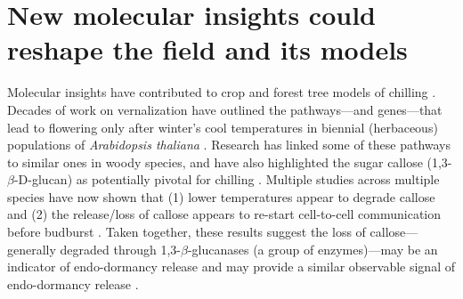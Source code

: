 \documentclass[11pt]{article}
\begin{document}
\section*{New molecular insights could reshape the field and its models} 

Molecular insights have contributed to crop and forest tree models of chilling \citep{chuinearees}. Decades of work on vernalization have outlined the pathways---and genes---that lead to flowering only after winter's cool temperatures in biennial (herbaceous) populations of \emph{Arabidopsis thaliana} \citep[Fig. \ref{fig:molecular},][]{Wilczek:2009oa,kim2009vernalization}. Research has linked some of these pathways to similar ones in woody species, and have also highlighted the sugar callose (1,3-$\beta$-{\sc D}-glucan) as potentially pivotal for chilling \citep{vanderschoot2014,pan2021aba}. Multiple studies across multiple species have now shown that (1) lower temperatures appear to degrade callose and (2) the release/loss of callose appears to re-start cell-to-cell communication before budburst \citep{vanderschoot2014}. Taken together, these results suggest the loss of callose---generally degraded through 1,3-$\beta$-glucanases (a group of enzymes)---may be an indicator of endo-dormancy release \citep[though other factors, such as  ABA, also often change at the same time,][]{tylewicz2018photoperiodic,pan2021aba} and may provide a similar observable signal of endo-dormancy release \citep{rinne2018,andre2022populus}. 

\end{document}

